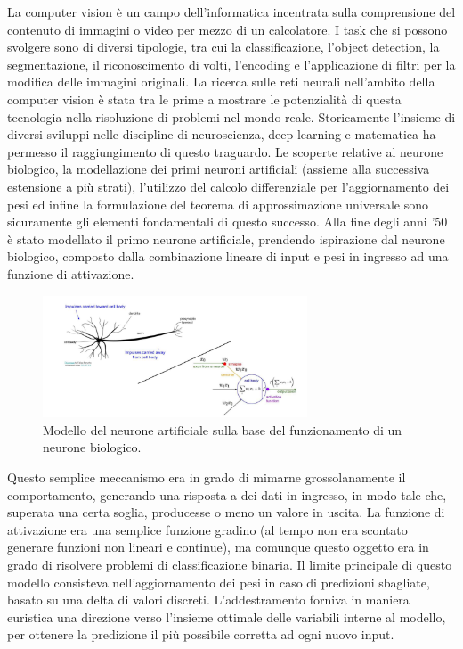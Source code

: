 La computer vision è un campo dell'informatica incentrata sulla comprensione del contenuto di immagini o video per mezzo di un calcolatore. I task che si possono svolgere sono di diversi tipologie, tra cui la classificazione, l'object detection, la segmentazione, il riconoscimento di volti, l'encoding e l'applicazione di filtri per la modifica delle immagini originali. La ricerca sulle reti neurali nell'ambito della computer vision è stata tra le prime a mostrare le potenzialità di questa tecnologia nella risoluzione di problemi nel mondo reale. Storicamente l'insieme di diversi sviluppi nelle discipline di neuroscienza, deep learning e matematica ha permesso il raggiungimento di questo traguardo. Le scoperte relative al neurone biologico, la modellazione dei primi neuroni artificiali (assieme alla successiva estensione a più strati), l'utilizzo del calcolo differenziale per l'aggiornamento dei pesi ed infine la formulazione del teorema di approssimazione universale sono sicuramente gli elementi fondamentali di questo successo. Alla fine degli anni '50 è stato modellato il primo neurone artificiale, prendendo ispirazione dal neurone biologico, composto dalla combinazione lineare di input e pesi in ingresso ad una funzione di attivazione.

\begin{figure}[htbp]
    \centering
    \includegraphics[width=0.7\textwidth]{figures/perceptron.png}
    \caption{Modello del neurone artificiale sulla base del funzionamento di un neurone biologico.}
    \label{fig:perceptron}
\end{figure}

\noindent Questo semplice meccanismo era in grado di mimarne grossolanamente il comportamento, generando una risposta a dei dati in ingresso, in modo tale che, superata una certa soglia, producesse o meno un valore in uscita. La funzione di attivazione era una semplice funzione gradino (al tempo non era scontato generare funzioni non lineari e continue), ma comunque questo oggetto era in grado di risolvere problemi di classificazione binaria. Il limite principale di questo modello consisteva nell'aggiornamento dei pesi in caso di predizioni sbagliate, basato su una delta di valori discreti. L'addestramento forniva in maniera euristica una direzione verso l'insieme ottimale delle variabili interne al modello, per ottenere la predizione il più possibile corretta ad ogni nuovo input. 

